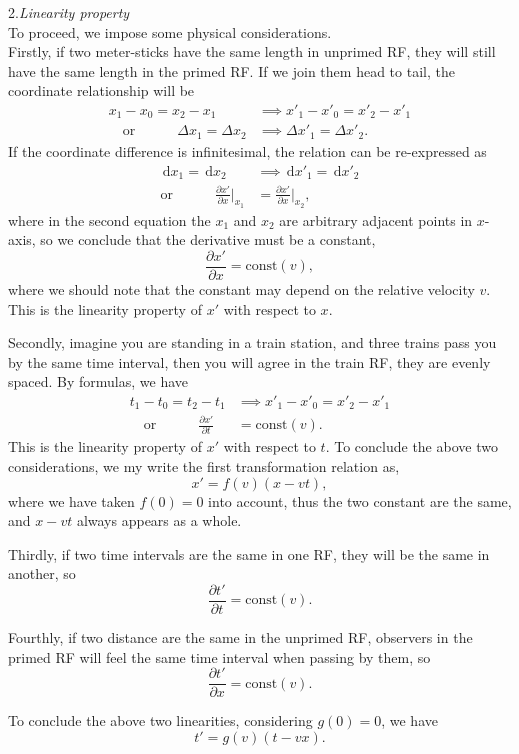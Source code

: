 \documentclass{article}
\newcommand{\be}{\begin{equation}}
\newcommand{\ee}{\end{equation}}
\newcommand{\bs}{\be\begin{split}}
\newcommand{\dif}{\,\mathrm{d}}
\newcommand{\p}{\partial}
\newcommand{\1}{\left}
\newcommand{\2}{\right}
\begin{document}
2.\textsl{Linearity property}\\

To proceed, we impose some physical considerations. \\

Firstly, if two meter-sticks have the same length in unprimed RF, they will still have the same length in the primed RF. If we join them head to tail, the coordinate relationship will be
\bs
x_1-x_0=x_2-x_1 &\implies x'_1-x'_0=x'_2-x'_1 \\
\quad\text{or}\qquad\quad \Delta x_1=\Delta x_2 &\implies \Delta x'_1=\Delta x'_2.
\end{split}\ee
If the coordinate difference is infinitesimal, the relation can be re-expressed as
\bs
\dif x_1=\dif x_2 &\implies \dif x'_1=\dif x'_2 \\
\text{or}\qquad\quad \frac{\p x'}{\p x}\bigg |_{x_1}&=\frac{\p x'}{\p x}\bigg |_{x_2},
\end{split}\ee
where in the second equation the $x_1$ and $x_2$ are arbitrary adjacent points in $x$-axis, so we conclude that the derivative must be a constant,
\be
\frac{\p x'}{\p x}=\text{const}(v),
\ee
where we should note that the constant may depend on   the relative velocity $v$. This is the linearity property of $x'$ with respect to $x$.

Secondly, imagine you are standing in a train station, and three trains pass you by the same time interval, then you will agree in the train RF, they are evenly spaced. By formulas, we have
\bs
t_1-t_0=t_2-t_1 &\implies x'_1-x'_0=x'_2-x'_1 \\
\quad\text{or}\qquad\quad \frac{\p x'}{\p t}&=\text{const}(v).
\end{split}\ee
This is the linearity property of $x'$ with respect to $t$.
To conclude the above two considerations, we my write the first transformation relation as,
\be
x'=f(v)(x-vt),
\ee
where we have taken $f(0)=0$ into account, thus the two constant are the same, and $x-vt$ always appears as a whole.

Thirdly, if two time intervals are the same in one RF, they will be the same in another, so
\be
\frac{\p t'}{\p t}=\text{const}(v).
\ee

Fourthly, if two distance are the same in the unprimed RF, observers in the primed RF will feel the same time interval when passing by them, so
\be
\frac{\p t'}{\p x}=\text{const}(v).
\ee

To conclude the above two linearities, considering $g(0)=0$, we have
\be
t'=g(v)(t-vx).
\ee
\end{document}
